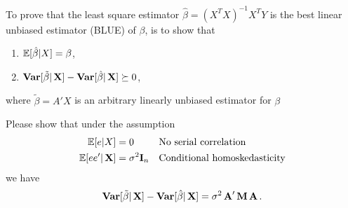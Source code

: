 \documentclass[UTF8,a4paper,10pt]{article}
\begin{document}
    \begin{solution}

      To prove that the least square estimator \(\hat{\beta} = (X^TX)^{-1}X^TY\) is the best linear unbiased estimator (BLUE) of \(\beta\), is to show that
      \begin{enumerate}[label=(\alph*)]
        \item \(\operatorname{\mathbb{E}}[\hat{\beta}|X] = \beta\),
        \item \(\operatorname{\textbf{Var}}[\tilde{\beta}|\operatorname{\mathbf{X}}]-\operatorname{\textbf{Var}}[\hat{\beta}|\operatorname{\mathbf{X}}]\succeq 0\),
      \end{enumerate}
      where \(\tilde{\beta} = A'X\) is an arbitrary linearly unbiased estimator for \(\beta\)





      Please show that under the assumption
      \begin{equation}
        \begin{aligned}
          \operatorname{\mathbb{E}}[e|X] &= 0&&\text{No serial correlation}\\
          \operatorname{\mathbb{E}}[ee'|\operatorname{\mathbf{X}}]&=\sigma^2\mathbf{I}_n&&\text{Conditional homoskedasticity}
        \end{aligned}
      \end{equation}
      we have
      \begin{equation}
        \begin{aligned}
          \operatorname{\textbf{Var}}[\tilde{\beta}|\operatorname{\mathbf{X}}]-\operatorname{\textbf{Var}}[\hat{\beta}|\operatorname{\mathbf{X}}] =\sigma^2\operatorname{\textbf{A}}'\operatorname{\mathbf{M}}\operatorname{\textbf{A}}.
        \end{aligned}
      \end{equation}











\end{solution}
\end{document}
